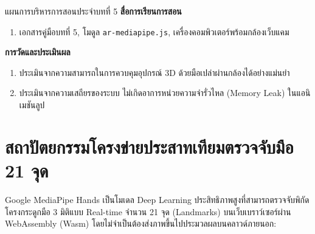 \begin{teachingplan}{แผนการบริหารการสอนประจำบทที่ 5}
\noindent\textbf{สื่อการเรียนการสอน}
\begin{enumerate}[leftmargin=1.5em, itemsep=2pt]
    \item เอกสารคู่มือบทที่ 5, โมดูล \texttt{ar-mediapipe.js}, เครื่องคอมพิวเตอร์พร้อมกล้องเว็บแคม
\end{enumerate}

\noindent\textbf{การวัดและประเมินผล}
\begin{enumerate}[leftmargin=1.5em, itemsep=2pt]
    \item ประเมินจากความสามารถในการควบคุมอุปกรณ์ 3D ด้วยมือเปล่าผ่านกล้องได้อย่างแม่นยำ
    \item ประเมินจากความเสถียรของระบบ ไม่เกิดอาการหน่วยความจำรั่วไหล (Memory Leak) ในแอนิเมชันลูป
\end{enumerate}
\end{teachingplan}

\newpage

\section{สถาปัตยกรรมโครงข่ายประสาทเทียมตรวจจับมือ 21 จุด}
Google MediaPipe Hands เป็นโมเดล Deep Learning ประสิทธิภาพสูงที่สามารถตรวจจับพิกัดโครงกระดูกมือ 3 มิติแบบ Real-time จำนวน 21 จุด (Landmarks) บนเว็บเบราว์เซอร์ผ่าน WebAssembly (Wasm) โดยไม่จำเป็นต้องส่งภาพขึ้นไปประมวลผลบนคลาวด์ภายนอก:

